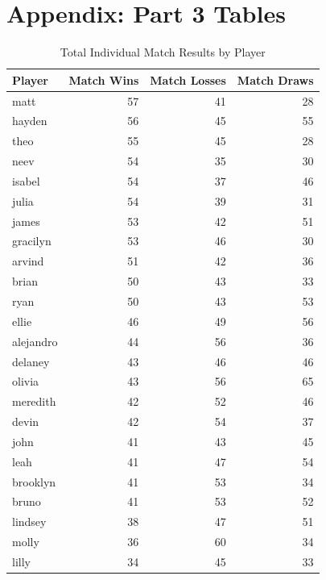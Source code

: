 \documentclass[12pt]{article}
\begin{document}
\newpage
\section*{Appendix: Part 3 Tables}

\begin{table}[H]
\centering
\caption{Total Individual Match Results by Player}
\label{tab:total_match_results}
\begin{tabular}{lrrr}
\toprule
\textbf{Player} & \textbf{Match Wins} & \textbf{Match Losses} & \textbf{Match Draws} \\
\midrule
matt      & 57 & 41 & 28 \\
hayden    & 56 & 45 & 55 \\
theo      & 55 & 45 & 28 \\
neev      & 54 & 35 & 30 \\
isabel    & 54 & 37 & 46 \\
julia     & 54 & 39 & 31 \\
james     & 53 & 42 & 51 \\
gracilyn  & 53 & 46 & 30 \\
arvind    & 51 & 42 & 36 \\
brian     & 50 & 43 & 33 \\
ryan      & 50 & 43 & 53 \\
ellie     & 46 & 49 & 56 \\
alejandro & 44 & 56 & 36 \\
delaney   & 43 & 46 & 46 \\
olivia    & 43 & 56 & 65 \\
meredith  & 42 & 52 & 46 \\
devin     & 42 & 54 & 37 \\
john      & 41 & 43 & 45 \\
leah      & 41 & 47 & 54 \\
brooklyn  & 41 & 53 & 34 \\
bruno     & 41 & 53 & 52 \\
lindsey   & 38 & 47 & 51 \\
molly     & 36 & 60 & 34 \\
lilly     & 34 & 45 & 33 \\
\bottomrule
\end{tabular}
\end{table}
\end{document}

